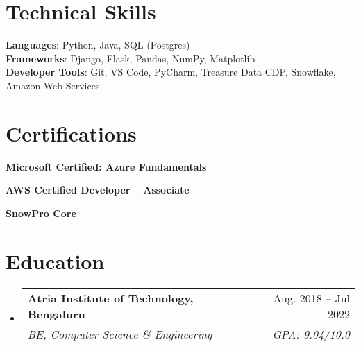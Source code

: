 \documentclass[letterpaper,11pt]{article}
\makeatletter
\newcommand{\resumeSubheading}[4]{
  \vspace{-2pt}\item
    \begin{tabular*}{0.97\textwidth}[t]{l@{\extracolsep{\fill}}r}
      \textbf{#1} & #2 \\
      \textit{\small#3} & \textit{\small #4} \\
    \end{tabular*}\vspace{-7pt}
}
\newcommand{\resumeSubHeadingListStart}{\begin{itemize}[leftmargin=0.15in, label={}]}
\newcommand{\resumeSubHeadingListEnd}{\end{itemize}}
\makeatother
\begin{document}
\section{Technical Skills}
 \begin{itemize}[leftmargin=0.15in, label={}]
    \small{\item{
     \textbf{Languages}{: Python, Java, SQL (Postgres)} \\
     \textbf{Frameworks}{: Django, Flask, Pandas, NumPy, Matplotlib} \\
     \textbf{Developer Tools}{: Git, VS Code, PyCharm, Treasure Data CDP, Snowflake, Amazon Web Services} \\
    }}
 \end{itemize}

\section{Certifications}
 \begin{itemize}[leftmargin=0.15in, label={}]
    \small{\item{
    {\textbf{Microsoft Certified: Azure Fundamentals} \quad \href{https://learn.microsoft.com/en-us/users/gauravsharma-7801/credentials/33e44c5243560a03}{{\color{gray}{\faLink}}}} 

     {\textbf{AWS Certified Developer – Associate} \quad \href{https://www.credly.com/badges/fe0c1bcc-c577-4f17-b96e-46935268b3f7/linked_in_profile} {{\color{gray}{\faLink }}}} 
    
     {\textbf{SnowPro Core} \quad \href{https://achieve.snowflake.com/b121fd98-943a-4de3-b9e4-3e6e518280e1#gs.g08k0q}{{\color{gray}{\faLink}}}} 
     }}
 \end{itemize}

\section{Education}
  \resumeSubHeadingListStart
    \resumeSubheading
      {Atria Institute of Technology, Bengaluru}{Aug. 2018 -- Jul 2022}
      {BE, Computer Science \& Engineering}{GPA: 9.04/10.0}
  \resumeSubHeadingListEnd



\end{document}
